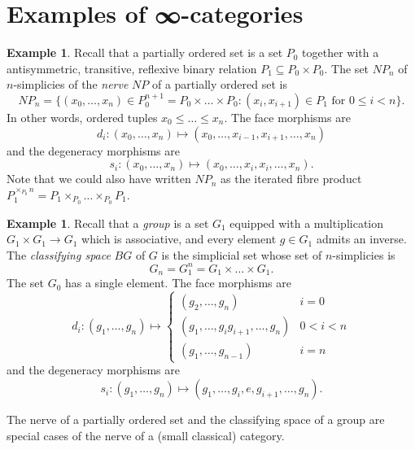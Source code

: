 \documentclass[a4paper]{amsart}
\numberwithin{figure}{section}
\theoremstyle{theorem}
\theoremstyle{definition}
\newtheorem{exam}[thm]{Example}
\begin{document}
\section*{Examples of ∞-categories}

\begin{exam} \label{exam:poset}
Recall that a partially ordered set is a set $P_0$ together with a antisymmetric, transitive, reflexive binary relation $P_1 \subseteq P_0 \times P_0$. The set $NP_n$ of $n$-simplicies of the \emph{nerve} $NP$ of a partially ordered set is 
\[ NP_n = \{ (x_0, \dots, x_n) \in P_0^{n+1} = P_0 \times \dots \times P_0 : (x_i, x_{i+1}) \in P_1\textrm{ for } 0 \leq i < n \}. \]
In other words, ordered tuples $x_0 \leq \dots \leq x_n$. The face morphisms are
\[ d_i: (x_0, \dots, x_n) \mapsto (x_0, \dots, x_{i-1}, x_{i+1}, \dots, x_n) \]
and the degeneracy morphisms are 
\[ s_i: (x_0, \dots, x_n) \mapsto (x_0, \dots, x_{i}, x_i, \dots, x_n). \]
Note that we could also have written $NP_n$ as the iterated fibre product $P_1^{\times_{P_0} n} = P_1 \times_{P_0} \dots \times_{P_0} P_1$. 
\end{exam}

\begin{exam} \label{exam:bg}
Recall that a \emph{group} is a set $G_1$ equipped with a multiplication $G_1 \times G_1 \to G_1$ which is associative, and every element $g \in G_1$ admits an inverse. The \emph{classifying space} $BG$ of $G$ is the simplicial set whose set of $n$-simplicies is 
\[ G_n = G_1^n = G_1 \times \dots \times G_1. \]
The set $G_0$ has a single element. The face morphisms are 
\[ d_i: (g_1, \dots, g_n) \mapsto \left \{ \begin{array}{cc}
(g_2, \dots, g_n) & i = 0 \\
(g_1, \dots, g_ig_{i+1}, \dots, g_n) & 0 < i < n \\
(g_1, \dots, g_{n-1}) & i = n
\end{array} \right . \]
and the degeneracy morphisms are
\[ s_i: (g_1, \dots, g_n) \mapsto (g_1, \dots, g_i, e, g_{i+1}, \dots, g_n). \]
\end{exam}

The nerve of a partially ordered set and the classifying space of a group are special cases of the nerve of a (small classical) category.
\end{document}
